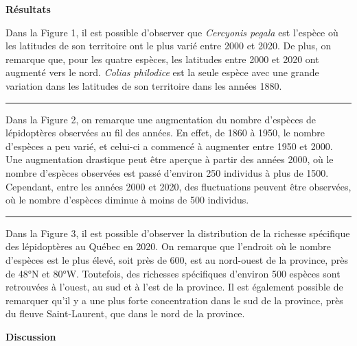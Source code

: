 \documentclass[9pt,twocolumn,twoside,]{pnas-new}
\begin{document}
\textbf{Résultats}

Dans la Figure 1, il est possible d'observer que \emph{Cercyonis pegala}
est l'espèce où les latitudes de son territoire ont le plus varié entre
2000 et 2020. De plus, on remarque que, pour les quatre espèces, les
latitudes entre 2000 et 2020 ont augmenté vers le nord. \emph{Colias
philodice} est la seule espèce avec une grande variation dans les
latitudes de son territoire dans les années 1880.

\begin{center}\rule{0.5\linewidth}{0.5pt}\end{center}

Dans la Figure 2, on remarque une augmentation du nombre d'espèces de
lépidoptères observées au fil des années. En effet, de 1860 à 1950, le
nombre d'espèces a peu varié, et celui-ci a commencé à augmenter entre
1950 et 2000. Une augmentation drastique peut être aperçue à partir des
années 2000, où le nombre d'espèces observées est passé d'environ 250
individus à plus de 1500. Cependant, entre les années 2000 et 2020, des
fluctuations peuvent être observées, où le nombre d'espèces diminue à
moins de 500 individus.

\begin{center}\rule{0.5\linewidth}{0.5pt}\end{center}

Dans la Figure 3, il est possible d'observer la distribution de la
richesse spécifique des lépidoptères au Québec en 2020. On remarque que
l'endroit où le nombre d'espèces est le plus élevé, soit près de 600,
est au nord-ouest de la province, près de 48°N et 80°W. Toutefois, des
richesses spécifiques d'environ 500 espèces sont retrouvées à l'ouest,
au sud et à l'est de la province. Il est également possible de remarquer
qu'il y a une plus forte concentration dans le sud de la province, près
du fleuve Saint-Laurent, que dans le nord de la province.

\textbf{Discussion }
\end{document}
